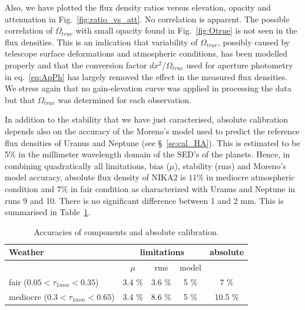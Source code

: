 Also, we have plotted the flux density ratios versus elevation, opacity and attenuation in  Fig.~\ref{fig:ratio_vs_att}.
No correlation is apparent. The possible correlation of $\Omega_{true}$ with small opacity found in Fig.~\ref{fig:Otrue}
is not seen in the flux densities. This is an indication that variability of $\Omega_{true}$, possibly 
caused by telescope surface deformations and atmospheric conditions,
has been modelled properly and  that the conversion factor
$dx^2/\Omega_{true}$ used for aperture photometry in eq.~\ref{eq:ApPh}
has largely removed the effect in the measured flux densities. 
We stress again that no gain-elevation curve was applied
in processing the data but that  $\Omega_{true}$ was determined for each observation.

In addition to the stability that we
have just caracterised, absolute calibration depends also on the
accuracy of the Moreno's model used to  predict the reference flux
densities of Uranus and Neptune (see \S~\ref{se:cal_HA}).    
This  is estimated to be 5\% in the millimeter wavelength domain of the SED's of the planets.
Hence, in combining quadratically all limitations, bias ($\mu$), stability (rms) and  Moreno's model accuracy, absolute flux density
of NIKA2 is $11\%$ in mediocre atmospheric
condition and  $7\%$ in fair condition as characterized with Uranus
and Neptune in runs 9 and 10. There is no significant difference
between 1 and 2 mm. This is summarised in Table~\ref{tab:cal_tot}.



\begin{table}[h]
\begin{center}
\begin{tabular}{|l|c|c|c|c|}
\hline
Weather  & \multicolumn{3}{|c|}{limitations} & absolute  \\
\hline
                &    $\mu$       &   rms   &    model  &    \\
\hline
 fair  ($0.05 < \tau_{1mm} < 0.35$)                      &       3.4 \%    &      3.6 \%   &    5 \%       &   7 \%    \\
 mediocre     ($0.3 < \tau_{1mm} < 0.65$)              &       3.4 \%    &      8.6 \%   &    5 \%      &  10.5 \%    \\
\hline
\end{tabular}
\caption[Calibration uncertainties using aperture photometry]{Accuracies of components and absolute calibration.}
\label{tab:cal_tot}
\end{center}
\end{table}


